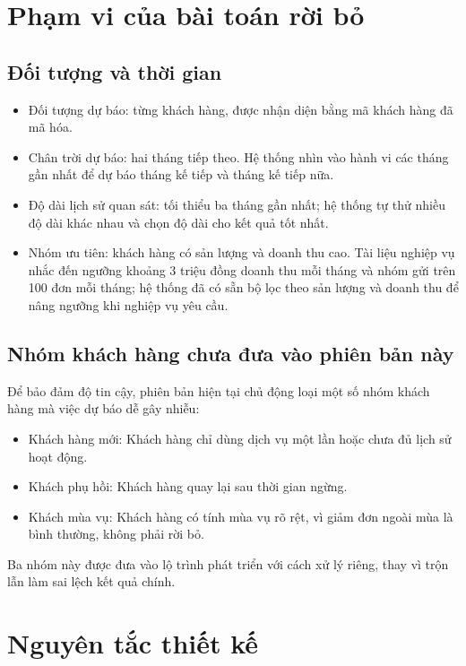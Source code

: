 \section{Phạm vi của bài toán rời bỏ}

\subsection{Đối tượng và thời gian}

\begin{itemize}
  \item Đối tượng dự báo: từng khách hàng, được nhận diện bằng mã khách hàng đã mã hóa.
  \item Chân trời dự báo: hai tháng tiếp theo. Hệ thống nhìn vào hành vi các tháng gần nhất để dự báo tháng kế tiếp và tháng kế tiếp nữa.
  \item Độ dài lịch sử quan sát: tối thiểu ba tháng gần nhất; hệ thống tự thử nhiều độ dài khác nhau và chọn độ dài cho kết quả tốt nhất.
  \item Nhóm ưu tiên: khách hàng có sản lượng và doanh thu cao. Tài liệu nghiệp vụ nhắc đến ngưỡng khoảng 3 triệu đồng doanh thu mỗi tháng và nhóm gửi trên 100 đơn mỗi tháng; hệ thống đã có sẵn bộ lọc theo sản lượng và doanh thu để nâng ngưỡng khi nghiệp vụ yêu cầu.
\end{itemize}

\subsection{Nhóm khách hàng chưa đưa vào phiên bản này}

Để bảo đảm độ tin cậy, phiên bản hiện tại chủ động loại một số nhóm khách hàng mà việc dự báo dễ gây nhiễu:

\begin{itemize}
  \item Khách hàng mới: Khách hàng chỉ dùng dịch vụ một lần hoặc chưa đủ lịch sử hoạt động.
  \item Khách phụ hồi: Khách hàng quay lại sau thời gian ngừng.
  \item Khách mùa vụ: Khách hàng có tính mùa vụ rõ rệt, vì giảm đơn ngoài mùa là bình thường, không phải rời bỏ.
\end{itemize}

Ba nhóm này được đưa vào lộ trình phát triển với cách xử lý riêng, thay vì trộn lẫn làm sai lệch kết quả chính.

\section{Nguyên tắc thiết kế}

